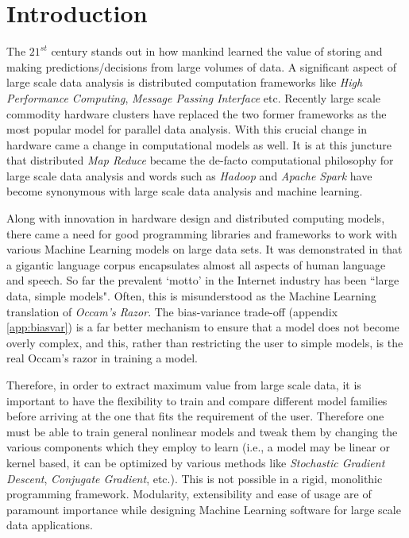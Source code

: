 \chapter{Introduction}
\label{cha:intro}
The $21^{st}$ century stands out in how mankind learned the value of storing and making predictions/decisions from large volumes of data. A significant aspect of large scale data analysis is distributed computation frameworks like \textit{High Performance Computing}, \textit{Message Passing Interface} etc. Recently large scale commodity hardware clusters have replaced the two former frameworks as the most popular model for parallel data analysis. With this crucial change in hardware came a change in computational models as well. It is at this juncture that distributed \textit{Map Reduce} became the de-facto computational philosophy for large scale data analysis and  words such as \textit{Hadoop} \cite{Hadoop:2005, chang2008bigtable, Borthakur2011} and \textit{Apache Spark} \cite{Zaharia2010, Spark:2010} have become synonymous with large scale data analysis and machine learning.

Along with innovation in hardware design and distributed computing models, there came a need for good programming libraries and frameworks to work with various Machine Learning models on large data sets. It was demonstrated in \cite{10.1109/MIS.2009.36} that a gigantic language corpus encapsulates almost all aspects of human language and speech. So far the prevalent `motto' in the Internet industry has been ``large data, simple models". Often, this is misunderstood as the Machine Learning translation of \textit{Occam's Razor}. The bias-variance trade-off \cite{Valentini2004} (appendix \ref{app:biasvar}) is a far better mechanism to ensure that a model does not become overly complex, and this, rather than restricting the user to simple models, is the real Occam's razor in training a model. 

Therefore, in order to extract maximum value from large scale data, it is important to have the flexibility to train and compare different model families before arriving at the one that fits the requirement of the user. Therefore one must be able to train general nonlinear models and tweak them by changing the various components which they employ to learn (i.e., a model may be linear or kernel based, it can be optimized by various methods like \textit{Stochastic Gradient Descent}, \textit{Conjugate Gradient}, etc.). This is not possible in a rigid, monolithic programming framework. Modularity, extensibility and ease of usage are of paramount importance while designing Machine Learning software for large scale data applications.

